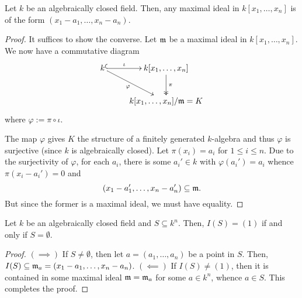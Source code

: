\begin{theorem}
    Let $k$ be an algebraically closed field. Then, any maximal ideal in $k[x_1,\dots,x_n]$ is of the form $(x_1 - a_1,\dots,x_n - a_n)$.
\end{theorem}
\begin{proof}
    It suffices to show the converse. Let $\mathfrak m$ be a maximal ideal in $k[x_1,\dots,x_n]$. We now have a commutative diagram 
    \begin{equation*}
        \xymatrix {
            k\ar@{^(->}[r]^-{\iota}\ar[rd]_-{\varphi} & k[x_1,\dots,x_n]\ar@{->>}[d]^-{\pi}\\
            & k[x_1,\dots,x_n]/\frakm = K
        }
    \end{equation*}
    where $\varphi := \pi\circ\iota$.

    The map $\varphi$ gives $K$ the structure of a finitely generated $k$-algebra and thus $\varphi$ is surjective (since $k$ is algebraically closed). Let $\pi(x_i) = a_i$ for $1\le i\le n$. Due to the surjectivity of $\varphi$, for each $a_i$, there is some $a_i'\in k$ with $\varphi(a_i') = a_i$ whence $\pi(x_i - a_i') = 0$ and 
    \begin{equation*}
        (x_1 - a_1',\dots,x_n - a_n')\subseteq\mathfrak m.
    \end{equation*}
    But since the former is a maximal ideal, we must have equality.
\end{proof}

\begin{theorem}
    Let $k$ be an algebraically closed field and $S\subseteq k^n$. Then, $I(S) = (1)$ if and only if $S = \emptyset$.
\end{theorem}
\begin{proof}
    $(\implies)$ If $S\ne\emptyset$, then let $a = (a_1,\dots,a_n)$ be a point in $S$. Then, $I(S)\subseteq\mathfrak m_a = (x_1 - a_1,\dots,x_n - a_n)$.
    $(\impliedby)$ If $I(S)\ne(1)$, then it is contained in some maximal ideal $\mathfrak m = \mathfrak m_a$ for some $a\in k^n$, whence $a\in S$. This completes the proof.
\end{proof}

